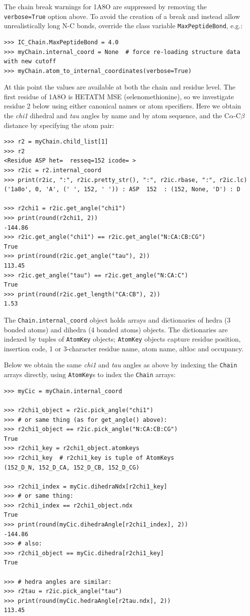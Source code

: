The chain break warnings for 1A8O are suppressed by removing the \texttt{verbose=True}
option above. To avoid the creation of a break and instead allow unrealistically long
N-C bonds, override the class variable \texttt{MaxPeptideBond}, e.g.:

\begin{verbatim}
>>> IC_Chain.MaxPeptideBond = 4.0
>>> myChain.internal_coord = None  # force re-loading structure data with new cutoff
>>> myChain.atom_to_internal_coordinates(verbose=True)
\end{verbatim}

At this point the values are available at both the chain and residue level.  The
first residue of 1A8O is HETATM MSE (selenomethionine), so we investigate residue 2
below using either canonical names or atom specifiers.  Here we obtain the \textit{chi1}
dihedral and \textit{tau} angles by name and by atom sequence, and the C$\alpha$-C$\beta$
distance by specifying the atom pair:

\begin{verbatim}
>>> r2 = myChain.child_list[1]
>>> r2
<Residue ASP het=  resseq=152 icode= >
>>> r2ic = r2.internal_coord
>>> print(r2ic, ":", r2ic.pretty_str(), ":", r2ic.rbase, ":", r2ic.lc)
('1a8o', 0, 'A', (' ', 152, ' ')) : ASP  152  : (152, None, 'D') : D

>>> r2chi1 = r2ic.get_angle("chi1")
>>> print(round(r2chi1, 2))
-144.86
>>> r2ic.get_angle("chi1") == r2ic.get_angle("N:CA:CB:CG")
True
>>> print(round(r2ic.get_angle("tau"), 2))
113.45
>>> r2ic.get_angle("tau") == r2ic.get_angle("N:CA:C")
True
>>> print(round(r2ic.get_length("CA:CB"), 2))
1.53
\end{verbatim}

The \texttt{Chain.internal\_coord} object holds arrays and dictionaries of hedra (3
bonded atoms) and dihedra (4 bonded atoms) objects.  The dictionaries are indexed 
by tuples of \texttt{AtomKey} objects; \texttt{AtomKey} objects capture residue position, insertion
code, 1 or 3-character residue name, atom name, altloc and occupancy.  

Below we obtain the same \textit{chi1} and \textit{tau} angles as above by indexing the \texttt{Chain}
arrays directly, using \texttt{AtomKey}s to index the \texttt{Chain} arrays: 

\begin{verbatim}
>>> myCic = myChain.internal_coord

>>> r2chi1_object = r2ic.pick_angle("chi1")
>>> # or same thing (as for get_angle() above):
>>> r2chi1_object == r2ic.pick_angle("N:CA:CB:CG")
True
>>> r2chi1_key = r2chi1_object.atomkeys
>>> r2chi1_key  # r2chi1_key is tuple of AtomKeys
(152_D_N, 152_D_CA, 152_D_CB, 152_D_CG)

>>> r2chi1_index = myCic.dihedraNdx[r2chi1_key]
>>> # or same thing:
>>> r2chi1_index == r2chi1_object.ndx
True
>>> print(round(myCic.dihedraAngle[r2chi1_index], 2))
-144.86
>>> # also:
>>> r2chi1_object == myCic.dihedra[r2chi1_key]
True

>>> # hedra angles are similar:
>>> r2tau = r2ic.pick_angle("tau")
>>> print(round(myCic.hedraAngle[r2tau.ndx], 2))
113.45
\end{verbatim}


